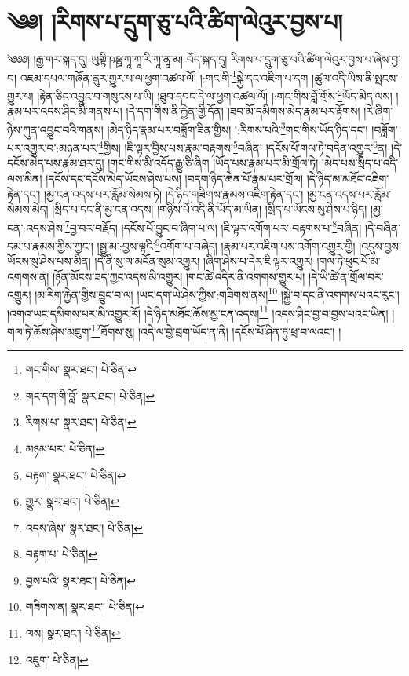 \setcounter{footnote}{0} 
\chapter{༄༅། །རིགས་པ་དྲུག་ཅུ་པའི་ཚིག་ལེའུར་བྱས་པ།}༄༅༅། །རྒྱ་གར་སྐད་དུ། ཡུགྟི་ཥཥྛ་ཀཱ་ཀཱ་རི་ཀཱ་ནཱ་མ། བོད་སྐད་དུ། རིགས་པ་དྲུག་ཅུ་པའི་ཚིག་ལེའུར་བྱས་པ་ཞེས་བྱ་བ། འཇམ་དཔལ་གཞོན་ནུར་གྱུར་པ་ལ་ཕྱག་འཚལ་ལོ། །:གང་གི་\footnote{གང་གིས་  སྣར་ཐང་།  པེ་ཅིན། }སྐྱེ་དང་འཇིག་པ་དག །ཚུལ་འདི་ཡིས་ནི་སྤངས་གྱུར་པ། །རྟེན་ཅིང་འབྱུང་བ་གསུངས་པ་ཡི། །ཐུབ་དབང་དེ་ལ་ཕྱག་འཚལ་ལོ། །:གང་གིས་བློ་གྲོས་\footnote{གང་དག་གི་བློ་  སྣར་ཐང་།  པེ་ཅིན། }ཡོད་མེད་ལས། །རྣམ་པར་འདས་ཤིང་མི་གནས་པ། །དེ་དག་གིས་ནི་རྐྱེན་གྱི་དོན། །ཟབ་མོ་དམིགས་མེད་རྣམ་པར་རྟོགས། །རེ་ཞིག་ཉེས་ཀུན་འབྱུང་བའི་གནས། །མེད་ཉིད་རྣམ་པར་བཟློག་ཟིན་གྱིས། །:རིགས་པའི་\footnote{རིགས་པ་  སྣར་ཐང་།  པེ་ཅིན། }གང་གིས་ཡོད་ཉིད་དང་། །བཟློག་པར་འགྱུར་བ་:མཉན་པར་\footnote{མཉམ་པར་  པེ་ཅིན། }གྱིས། །ཇི་ལྟར་བྱིས་པས་རྣམ་བརྟགས་\footnote{བརྟག་  སྣར་ཐང་།  པེ་ཅིན། }བཞིན། །དངོས་པོ་གལ་ཏེ་བདེན་འགྱུར་\footnote{གྱུར་  སྣར་ཐང་།  པེ་ཅིན། }ན། །དེ་དངོས་མེད་པས་རྣམ་ཐར་དུ། །གང་གིས་མི་འདོད་རྒྱུ་ཅི་ཞིག །ཡོད་པས་རྣམ་པར་མི་གྲོལ་ཏེ། །མེད་པས་སྲིད་པ་འདི་ལས་མིན། །དངོས་དང་དངོས་མེད་ཡོངས་ཤེས་པས། །བདག་ཉིད་ཆེན་པོ་རྣམ་པར་གྲོལ། །དེ་ཉིད་མ་མཐོང་འཇིག་རྟེན་དང་། །མྱ་ངན་འདས་པར་རློམ་སེམས་ཏེ། །དེ་ཉིད་གཟིགས་རྣམས་འཇིག་རྟེན་དང་། །མྱ་ངན་འདས་པར་རློམ་སེམས་མེད། །སྲིད་པ་དང་ནི་མྱ་ངན་འདས། །གཉིས་པོ་འདི་ནི་ཡོད་མ་ཡིན། །སྲིད་པ་ཡོངས་སུ་ཤེས་པ་ཉིད། །མྱ་ངན་:འདས་ཤེས་\footnote{འདས་ཞེས་  སྣར་ཐང་།  པེ་ཅིན། }བྱ་བར་བརྗོད། །དངོས་པོ་བྱུང་བ་ཞིག་པ་ལ། །ཇི་ལྟར་འགོག་པར་:བརྟགས་པ་\footnote{བརྟག་པ་  པེ་ཅིན། }བཞིན། །དེ་བཞིན་དམ་པ་རྣམས་ཀྱིས་ཀྱང་། །སྒྱུ་མ་:བྱས་ལྟའི་\footnote{བྱས་པའི་  སྣར་ཐང་།  པེ་ཅིན། }འགོག་པ་བཞེད། །རྣམ་པར་འཇིག་པས་འགོག་འགྱུར་གྱི། །འདུས་བྱས་ཡོངས་སུ་ཤེས་པས་མིན། །དེ་ནི་སུ་ལ་མངོན་སུམ་འགྱུར། །ཞིག་ཤེས་པ་དེར་ཇི་ལྟར་འགྱུར། །གལ་ཏེ་ཕུང་པོ་མ་འགགས་ན། །ཉོན་མོངས་ཟད་ཀྱང་འདས་མི་འགྱུར། །གང་ཚེ་འདིར་ནི་འགགས་གྱུར་པ། །དེ་ཡི་ཚེ་ན་གྲོལ་བར་འགྱུར། །མ་རིག་རྐྱེན་གྱིས་བྱུང་བ་ལ། །ཡང་དག་ཡེ་ཤེས་ཀྱིས་:གཟིགས་ནས།\footnote{གཟིགས་ན།  སྣར་ཐང་།  པེ་ཅིན། } །སྐྱེ་བ་དང་ནི་འགགས་པའང་རུང་། །འགའ་ཡང་དམིགས་པར་མི་འགྱུར་རོ། །དེ་ཉིད་མཐོང་ཆོས་མྱ་ངན་འདས།\footnote{ལས།  སྣར་ཐང་།  པེ་ཅིན། } །འདས་ཤིང་བྱ་བ་བྱས་པའང་ཡིན། །གལ་ཏེ་ཆོས་ཤེས་མཇུག་\footnote{འཇུག་  པེ་ཅིན། }ཐོགས་སུ། །འདི་ལ་བྱེ་བྲག་ཡོད་ན་ནི། །དངོས་པོ་ཤིན་ཏུ་ཕྲ་བ་ལའང་། །
